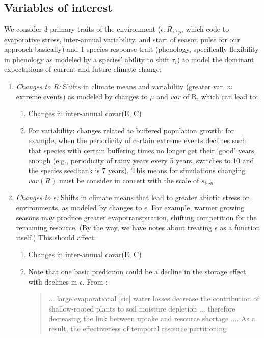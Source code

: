 \documentclass[11pt,a4paper,oneside]{article}
\begin{document}
\subsection{Variables of interest}
We consider 3 primary traits of the environment (\(\epsilon, R, \tau_{p}\), which
code to evaporative stress, inter-annual variability, and start of season pulse for our approach basically) and 1
species response trait (phenology, specifically flexibility in
phenology as modeled by a species' ability to shift \(\tau_{i}\)) to model
the dominant expectations of current and future climate change:
\begin{enumerate}
\item \emph{Changes to R:} Shifts in climate means and variability (greater var \(\approx\)
  extreme events) as modeled by changes to \(\mu\) and \(var\) of
    R,
  which can lead to:
\begin{enumerate}
\item Changes in inter-annual covar(E, C)
\item For variability: changes related to buffered population growth:
  for example, when the periodicity of certain extreme events declines
  such that species with certain buffering times no longer get their
  `good' years enough (e.g., periodicity of rainy years every 5 years,
  switches to 10 and the species seedbank is 7 years). This means for
  simulations changing \(var(R)\) must be consider in concert with the
  scale of \(s_{i\cdots n}\).
\end{enumerate}
\item \emph{Changes to \(\epsilon\):} Shifts in climate means that lead to greater abiotic stress on
  environments, as modeled by changes to  \(\epsilon\). For example,
  warmer growing seasons may produce greater evapotranspiration,
  shifting competition for the remaining resource. (By the way, we
  have notes about treating \(\epsilon\) as a function itself.) This should
  affect:
\begin{enumerate}
\item Changes in inter-annual covar(E, C)
\item Note that one basic prediction could be a decline in the storage effect with declines in \(\epsilon\). From \citet{Chesson:2004eo}:
\begin{quote}
... large evaporational [sic] water
losses decrease the contribution of shallow-rooted plants
to soil moisture depletion ... therefore decreasing the link
between uptake and resource shortage .... As
a result, the effectiveness of temporal resource partitioning

\end{quote}
\end{enumerate}
\end{enumerate}
\end{document}
